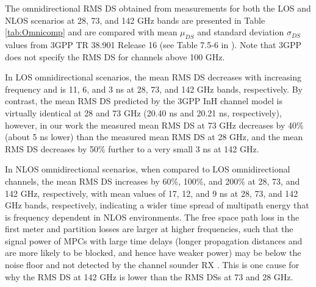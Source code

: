 \documentclass[conference]{IEEEtran}
\begin{document}

The omnidirectional RMS DS obtained from measurements for both the LOS and NLOS scenarios at 28, 73, and 142 GHz bands \cite{Ju20a,Mac15b} are presented in Table \ref{tab:Omnicomp} and are compared with mean $\mu_{DS}$ and standard deviation $\sigma_{DS}$ values from 3GPP TR 38.901 Release 16 (see Table 7.5-6 in \cite{3GPP2019}). Note that 3GPP does not specify the RMS DS for channels above 100 GHz. 

In LOS omnidirectional scenarios, the mean RMS DS decreases with increasing frequency and is 11, 6, and 3 ns at 28, 73, and 142 GHz bands, respectively. By contrast, the mean RMS DS predicted by the 3GPP InH channel model is virtually identical at 28 and 73 GHz (20.40 ns and 20.21 ns, respectively), however, in our work the measured mean RMS DS at 73 GHz decreases by 40\% (about 5 ns lower) than the measured mean RMS DS at 28 GHz, and the mean RMS DS decreases by 50\% further to a very small 3 ns at 142 GHz.

In NLOS omnidirectional scenarios, when compared to LOS omnidirectional channels, the mean RMS DS increases by 60\%, 100\%, and 200\%  at 28, 73, and 142 GHz, respectively, with mean values of 17, 12, and 9 ns at 28, 73, and 142 GHz bands, respectively, indicating a wider time spread of multipath energy that is frequency dependent in NLOS environments. The free space path loss in the first meter and partition losses are larger at higher frequencies, such that the signal power of MPCs with large time delays (longer propagation distances and are more likely to be blocked, and hence have weaker power) may be below the noise floor and not detected by the channel sounder RX \cite{rappaport2015wideband}. This is one cause for why the RMS DS at 142 GHz is lower than the RMS DSs at 73 and 28 GHz. 

\end{document}
